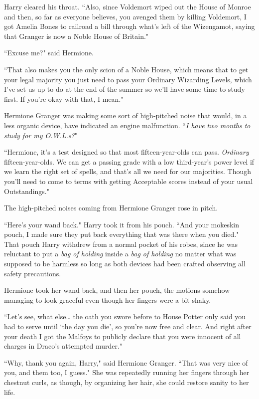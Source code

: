 Harry cleared his throat. ``Also, since Voldemort wiped out the House of Monroe and then, so far as everyone believes, you avenged them by killing Voldemort, I got Amelia Bones to railroad a bill through what's left of the Wizengamot, saying that Granger is now a Noble House of Britain."

``Excuse me?" said Hermione.

``That also makes you the only scion of a Noble House, which means that to get your legal majority you just need to pass your Ordinary Wizarding Levels, which I've set us up to do at the end of the summer so we'll have some time to study first. If you're okay with that, I mean."

Hermione Granger was making some sort of high-pitched noise that would, in a less organic device, have indicated an engine malfunction. ``\emph{I have two months to study for my O.W.L.s?}"

``Hermione, it's a test designed so that most fifteen-year-olds can pass. \emph{Ordinary} fifteen-year-olds. We can get a passing grade with a low third-year's power level if we learn the right set of spells, and that's all we need for our majorities. Though you'll need to come to terms with getting Acceptable scores instead of your usual Outstandings."

The high-pitched noises coming from Hermione Granger rose in pitch.

``Here's your wand back." Harry took it from his pouch. ``And your mokeskin pouch, I made sure they put back everything that was there when you died." That pouch Harry withdrew from a normal pocket of his robes, since he was reluctant to put a \emph{bag of holding} inside a \emph{bag of holding} no matter what was supposed to be harmless so long as both devices had been crafted observing all safety precautions.

Hermione took her wand back, and then her pouch, the motions somehow managing to look graceful even though her fingers were a bit shaky.

``Let's see, what else{\ldots} the oath you swore before to House Potter only said you had to serve until `the day you die', so you're now free and clear. And right after your death I got the Malfoys to publicly declare that you were innocent of all charges in Draco's attempted murder."

``Why, thank you again, Harry," said Hermione Granger. ``That was very nice of you, and them too, I guess." She was repeatedly running her fingers through her chestnut curls, as though, by organizing her hair, she could restore sanity to her life.

